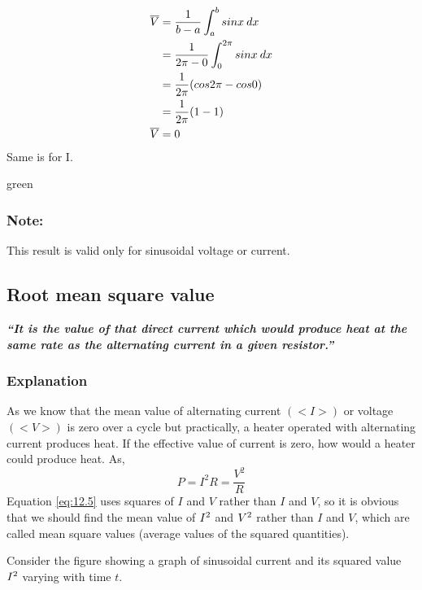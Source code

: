 \begin{equation}\notag
\begin{split}
    \overline{V}&= \frac{1}{b-a} \int_{a}^{b} sinx\:dx\\
     &= \frac{1}{2\pi-0} \int_{0}^{2\pi} sinx\:dx\\
     &= \frac{1}{2\pi} (cos2 \pi - cos0)\\ 
     &= \frac{1}{2\pi} (1-1)\\
     \overline{V}&=0 
\end{split}
\end{equation}
Same is for I.
\begin{mybox}{green}{}
\subsubsection*{\note{}Note:}This result is valid only for sinusoidal
voltage or current.   
\end{mybox}
\subsection{Root mean square value}
\textit{\textbf{“It is the value of that direct current which would produce heat at the same rate as the alternating current in a given resistor.”}}  

\subsubsection*{Explanation}
As we know that the mean value of alternating current $(<I>)$ or voltage $(<V>)$ is zero over a cycle but practically, a heater operated with alternating current produces heat. If the effective value of current is zero, how would a heater could produce heat. As,
\begin{equation}
    P= I^{2}R = \frac{V^{2}}{R}
\end{equation}
Equation \ref{eq:12.5} uses squares of $I$ and $V$ rather than $I$ and $V$,
so it is obvious that we should find the mean value
of $I\textsuperscript{2}$ and $V\textsuperscript{2}$ rather than $I$
and $V$, which are called mean square values (average values of
the squared quantities).

Consider the figure showing a graph of sinusoidal current and its
squared value $I\textsuperscript{2}$ varying with time $t$.

